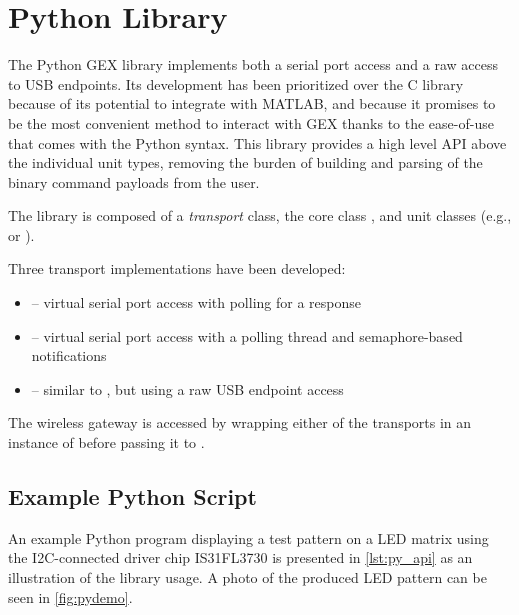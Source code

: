 \section{Python Library}

The Python GEX library implements both a serial port access and a raw access to \gls{USB} endpoints. Its development has been prioritized over the C library because of its potential to integrate with MATLAB, and because it promises to be the most convenient method to interact with GEX thanks to the ease-of-use that comes with the Python syntax. This library provides a high level \gls{API} above the individual unit types, removing the burden of building and parsing of the binary command payloads from the user.

The library is composed of a \textit{transport} class, the core class , and unit classes (e.g.,  or ). 

\noindent
Three transport implementations have been developed:

\begin{itemize}
    \item {} -- virtual serial port access with polling for a response

    \item {} -- virtual serial port access with a polling thread and semaphore-based notifications

    \item {} -- similar to , but using a raw USB endpoint access
\end{itemize}

The wireless gateway is accessed by wrapping either of the transports in an instance of  before passing it to .

\subsection{Example Python Script}

An example Python program displaying a test pattern on a \gls{LED} matrix using the \gls{I2C}-connected driver chip IS31FL3730 is presented in \cref{lst:py_api} as an illustration of the library usage. A photo of the produced \gls{LED} pattern can be seen in \cref{fig:pydemo}.

